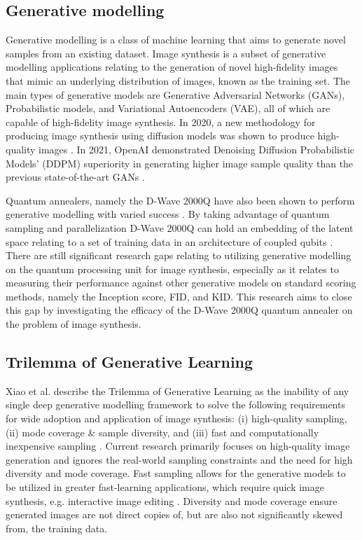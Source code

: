 \documentclass[%
 reprint,
 amsmath,amssymb,
 aps,
]{revtex4-2}
\begin{document}
\subsection{Generative modelling}
\noindent
Generative modelling is a class of machine learning that aims to generate novel samples from an existing dataset. Image synthesis is a subset of generative modelling applications relating to the generation of novel high-fidelity images that mimic an underlying distribution of images, known as the training set. The main types of generative models are Generative Adversarial Networks (GANs), Probabilistic models, and Variational Autoencoders (VAE), all of which are capable of high-fidelity image synthesis. In 2020, a new methodology for producing image synthesis using diffusion models was shown to produce high-quality images \cite{ho2020denoising}. In 2021, OpenAI demonstrated Denoising Diffusion Probabilistic Models' (DDPM) superiority in generating higher image sample quality than the previous state-of-the-art GANs \cite{dhariwal2021diffusion}. 

Quantum annealers, namely the D-Wave 2000Q have also been shown to perform generative modelling with varied success \cite{Jain2020}\cite{Thulasidasan2016}. By taking advantage of quantum sampling and parallelization D-Wave 2000Q can hold an embedding of the latent space relating to a set of training data in an architecture of coupled qubits \cite{Amin_2018}. There are still significant research gaps relating to utilizing generative modelling on the quantum processing unit for image synthesis, especially as it relates to measuring their performance against other generative models on standard scoring methods, namely the Inception score, FID, and KID. This research aims to close this gap by investigating the efficacy of the D-Wave 2000Q quantum annealer on the problem of image synthesis.

\subsection{Trilemma of Generative Learning}
\label{trilemmaGL}
Xiao et al. describe the Trilemma of Generative Learning as the inability of any single deep generative modelling framework to solve the following requirements for wide adoption and application of image synthesis: (i) high-quality sampling, (ii) mode coverage & sample diversity, and (iii) fast and computationally inexpensive sampling \cite{xiao2022DDGAN}. Current research primarily focuses on high-quality image generation and ignores the real-world sampling constraints and the need for high diversity and mode coverage. Fast sampling allows for the generative models to be utilized in greater fast-learning applications, which require quick image synthesis, e.g. interactive image editing \cite{xiao2022DDGAN}. Diversity and mode coverage ensure generated images are not direct copies of, but are also not significantly skewed from, the training data.
\end{document}
